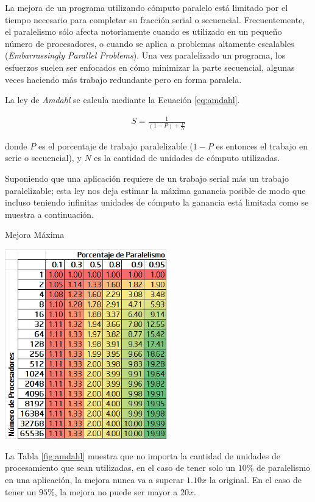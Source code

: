 \documentclass[a4paper]{report}
\begin{document}
La mejora de un programa utilizando cómputo paralelo está limitado por el tiempo necesario para completar su fracción serial o secuencial. Frecuentemente, el paralelismo sólo afecta notoriamente cuando es utilizado en un pequeño número de procesadores, o cuando se aplica a problemas altamente escalables ({\it Embarrassingly Parallel Problems}). Una vez paralelizado un programa, los esfuerzos suelen ser enfocados en cómo minimizar la parte secuencial, algunas veces haciendo más trabajo redundante pero en forma paralela.

\bigskip

La ley de {\it Amdahl} se calcula mediante la Ecuación \ref{eq:amdahl}.

\begin{eqnarray}
\label{eq:amdahl}
S = \frac{1}{(1 - P) + \frac{P}{N}}
\end{eqnarray}

donde $ P $ es el porcentaje de trabajo paralelizable ($ 1-P $ es entonces el trabajo en serie o secuencial), y $ N $ es la cantidad de unidades de cómputo utilizadas.

\bigskip

Suponiendo que una aplicación requiere de un trabajo serial más un trabajo paralelizable; esta ley nos deja estimar la máxima ganancia posible de modo que incluso teniendo infinitas unidades de cómputo la ganancia está limitada como se muestra a continuación.

\begin{table}[H]
\caption{Mejora Máxima}
\centering
\includegraphics[width=7cm]{amdahl.png}

\label{fig:amdahl}
\end{table}

La Tabla \ref{fig:amdahl} muestra que no importa la cantidad de unidades de
procesamiento que sean utilizadas, en el caso de tener solo un $ 10\% $ de paralelismo
en una aplicación, la mejora nunca va a superar $ 1.10x $ la original.
En el caso de tener un $ 95\% $, la mejora no puede ser mayor a $ 20x $.
\end{document}
